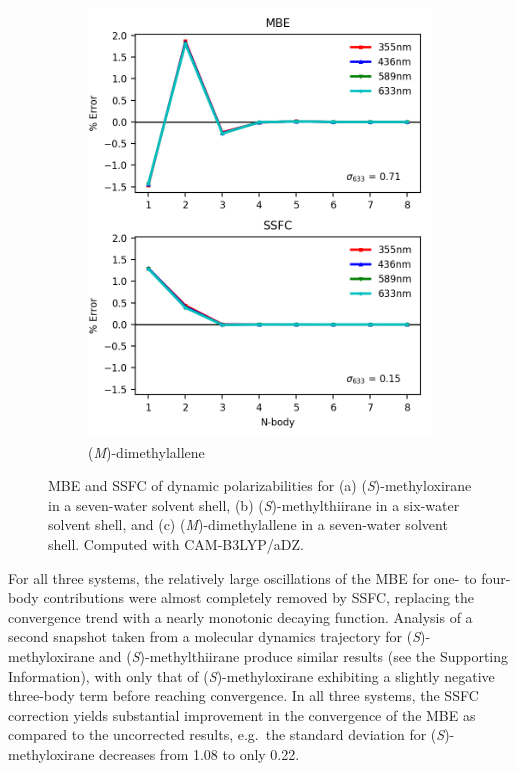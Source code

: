 \begin{figure}
\begin{subfigure}{0.5\textwidth}
                \centering\includegraphics[scale=0.75]{p1/graphs/dma_7_pol.png}
                \caption{(\textit{M})-dimethylallene}
                \label{dma_7_pol}
            \end{subfigure}
            \caption{MBE and SSFC of dynamic polarizabilities for (a) (\textit{S})-methyloxirane in a seven-water solvent shell, (b) (\textit{S})-methylthiirane in a six-water solvent shell, and (c) (\textit{M})-dimethylallene in a seven-water solvent shell. Computed with CAM-B3LYP/aDZ.}
            \label{metox_metthi_dma_pol}
        \end{figure}
        For all three systems, the relatively large oscillations of the MBE for one- to four-body contributions were almost completely removed by SSFC, replacing the convergence trend with a nearly monotonic decaying function.  Analysis of a second snapshot taken from a molecular dynamics trajectory for (\textit{S})-methyloxirane and (\textit{S})-methylthiirane produce similar results (see the Supporting Information), with only that of (\textit{S})-methyloxirane exhibiting a slightly negative three-body term before reaching convergence.  In all three systems, the SSFC correction yields substantial improvement in the convergence of the MBE as compared to the uncorrected results, e.g.\ the standard deviation for (\textit{S})-methyloxirane decreases from 1.08 to only 0.22.

